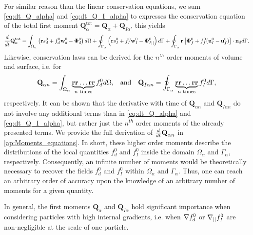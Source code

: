 For similar reason than the linear conservation equations, we sum \ref{eq:dt_Q_alpha} and \ref{eq:dt_Q_I_alpha} to expresses the conservation equation of the total first moment $\textbf{Q}_\alpha^\text{tot} = \textbf{Q}_\alpha + \textbf{Q}_{I\alpha}$, this yields 
\begin{multline}
    \frac{d}{dt} {\textbf{Q}_\alpha^\text{tot}}
    = \int_{\Omega_\alpha}  \left(
        \textbf{r} s_d^0         
        + f_d^0  \textbf{w}_d^0 
        - \mathbf{\Phi}_d^0
    \right)  d\Omega
    + \oint_{\Gamma_\alpha}  \left(
        \textbf{r}s_I^0
        + f_I^0 \textbf{w}_I^0
        - \mathbf{\Phi}_{I||}^0
    \right)  d\Gamma
    + \oint_{\Gamma_\alpha}  \textbf{r} \left[
        \mathbf{\Phi}_f^0
        + f_f^0 (\textbf{u}_I^0-\textbf{u}_f^0)
    \right]\cdot \textbf{n}_d   d\Gamma. 
    \label{eq:dt_Q_alpha_tot}
\end{multline}
Likewise, conservation laws can be derived for the $n^{th}$ order moments of volume and surface, i.e. for
\begin{align}
    \textbf{Q}_{\alpha n}
    = \int_{\Omega_\alpha} 
         \underbrace{\textbf{rr}\ldots \textbf{rr}}_{n\text{ times}}
        f_d^0  d\Omega,
        && \text{and} &&
    \textbf{Q}_{I\alpha n}
    = \oint_{\Gamma_\alpha} 
         \underbrace{\textbf{rr}\ldots \textbf{rr}}_{n\text{ times}}
    f_I^0  d\Gamma,
    \label{eq:Q_n_definition}
\end{align} 
respectively. 
It can be shown that the derivative with time of $\textbf{Q}_{\alpha n}$ and $\textbf{Q}_{I\alpha n}$ do not involve any additional terms than in \ref{eq:dt_Q_alpha} and \ref{eq:dt_Q_I_alpha}, but rather just the $n^{th}$ order moments of the already presented terms.
We provide the full derivation of $\frac{d}{dt}{ \textbf{Q}_{\alpha n}}$ in \ref{ap:Moments_equations}.
In short, these higher order moments describe the distributions of the local quantities $f_d^0$ and $f_I^0$ inside the domain $\Omega_\alpha$ and $\Gamma_\alpha$, respectively.
Consequently, an infinite number of moments would be theoretically necessary to recover the fields $f_d^0$ and $f_I^0$ within $\Omega_\alpha$ and $\Gamma_\alpha$. 
Thus, one can reach an arbitrary order of accuracy upon the knowledge of an arbitrary number of moments for a given quantity.  

In general, the first moments $\textbf{Q}_{\alpha}$ and $\textbf{Q}_{I\alpha}$ hold significant importance when considering particles with high internal gradients, i.e. when $\mathbf{\nabla} f_d^0$ or $\mathbf{\nabla}_{||} f_I^0$ are non-negligible at the scale of one particle. 